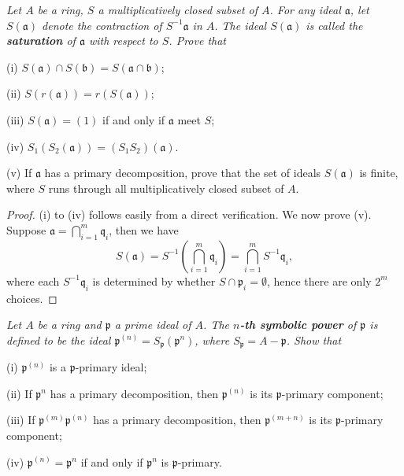 \begin{problem}\em
Let $A$ be a ring, $S$ a multiplicatively closed subset of $A$. For any ideal $\mathfrak{a}$, let $S(\mathfrak{a})$ denote the contraction of $S^{-1}\mathfrak{a}$ in $A$. The ideal $S(\mathfrak{a})$ is called the \textbf{saturation} of $\mathfrak{a}$ with respect to $S$. Prove that \par
(i) $S(\mathfrak{a})\cap S(\mathfrak{b})=S(\mathfrak{a}\cap\mathfrak{b})$;\par
(ii) $S(r(\mathfrak{a}))=r(S(\mathfrak{a}))$;\par
(iii) $S(\mathfrak{a})=(1)$ if and only if $\mathfrak{a}$ meet $S$;\par
(iv) $S_1(S_2(\mathfrak{a}))=(S_1S_2)(\mathfrak{a})$. \par
(v) If $\mathfrak{a}$ has a primary decomposition, prove that the set of ideals $S(\mathfrak{a})$ is finite, where $S$ runs through all multiplicatively closed subset of $A$.
\end{problem}
\begin{proof}
(i) to (iv) follows easily from a direct verification. We now prove (v). Suppose $\mathfrak{a}=\bigcap_{i=1}^m\mathfrak{q}_i$, then we have 
$$
S\left( \mathfrak{a} \right) =S^{-1}\left( \bigcap_{i=1}^m{\mathfrak{q} _i} \right) =\bigcap_{i=1}^m{S^{-1}\mathfrak{q} _i},
$$
where each $S^{-1}\mathfrak{q}_i$ is determined by whether $S\cap\mathfrak{p}_i=\emptyset$, hence there are only $2^m$ choices.
\end{proof}
\begin{problem}\em
Let $A$ be a ring and $\mathfrak{p}$ a prime ideal of $A$. The \textbf{$n$-th symbolic power} of $\mathfrak{p}$ is defined to be the ideal $\mathfrak{p}^{(n)}=S_\mathfrak{p}(\mathfrak{p}^n)$, where $S_\mathfrak{p}=A-\mathfrak{p}$. Show that \par
(i) $\mathfrak{p}^{(n)}$ is a $\mathfrak{p}$-primary ideal;\par
(ii) If $\mathfrak{p}^n$ has a primary decomposition, then $\mathfrak{p}^{(n)}$ is its $\mathfrak{p}$-primary component;\par
(iii) If $\mathfrak{p}^{(m)}\mathfrak{p}^{(n)}$ has a primary decomposition, then $\mathfrak{p}^{(m+n)}$ is its $\mathfrak{p}$-primary component;\par
(iv) $\mathfrak{p}^{(n)}=\mathfrak{p}^n$ if and only if $\mathfrak{p}^n$ is $\mathfrak{p}$-primary.
\end{problem}
